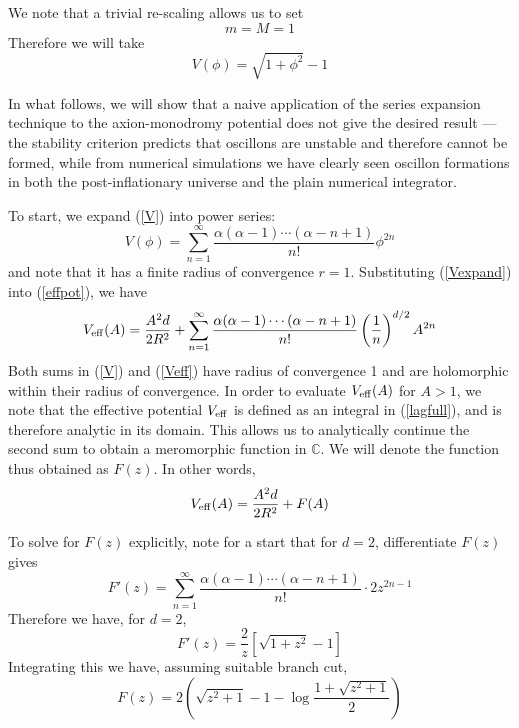 \documentclass{report}
\begin{document}
We note that a trivial re-scaling allows us to set
\begin{equation}
  m=M=1
\end{equation}
Therefore we will take
\begin{equation}\label{V}
  V(\phi)=\sqrt{1+\phi^2}-1
\end{equation}

In what follows, we will show that a naive application of the series expansion technique to the axion-monodromy potential does not give the desired result --- the stability criterion predicts that oscillons are unstable and therefore cannot be formed, while from numerical simulations we have clearly seen oscillon formations in both the post-inflationary universe and the plain numerical integrator.

To start, we expand (\ref{V}) into power series:
\begin{equation}\label{Vexpand}
  V(\phi)=\sum_{n=1}^\infty\frac{\alpha(\alpha-1)\cdots(\alpha-n+1)}{n!}\phi^{2n}
\end{equation}
and note that it has a finite radius of convergence $r=1$. Substituting (\ref{Vexpand}) into (\ref{effpot}), we have
\begin{equation}\label{Veff}
  V_{\rm eff}(A)=\frac{A^2d}{2R^2} + \sum_{n=1}^\infty\frac{\alpha(\alpha-1)\cdots(\alpha-n+1)}{n!}
  \left(\frac{1}{n}\right)^{d/2}A^{2n}
\end{equation}
Both sums in (\ref{V}) and (\ref{Veff}) have radius of convergence 1 and are holomorphic within their radius of convergence. In order to evaluate $V_{\rm eff}(A)$ for $A>1$, we note that the effective potential $V_{\rm eff}$ is defined as an integral in (\ref{lagfull}), and is therefore analytic in its domain. This allows us to analytically continue the second sum to obtain a meromorphic function in $\mathbb{C}$. We will denote the function thus obtained as $F(z)$. In other words,
\begin{equation}\label{VeffFz}
  V_{\rm eff}(A) = \frac{A^2d}{2R^2} + F(A)
\end{equation}

To solve for $F(z)$ explicitly, note for a start that for $d=2$, differentiate $F(z)$ gives
\begin{equation}
  F'(z)=\sum_{n=1}^\infty\frac{\alpha(\alpha-1)\cdots(\alpha-n+1)}{n!} \cdot 2 z^{2n-1}
\end{equation}
Therefore we have, for $d=2$,
\begin{equation}
  F'(z)=\frac{2}{z}\left[\sqrt{1+z^2}-1\right]
\end{equation}
Integrating this we have, assuming suitable branch cut,
\begin{equation}
  F(z) = 2 \left(\sqrt{z^2+1}-1-\log \frac{1+\sqrt{z^2+1}}{2}\right)
\end{equation}
\end{document}

